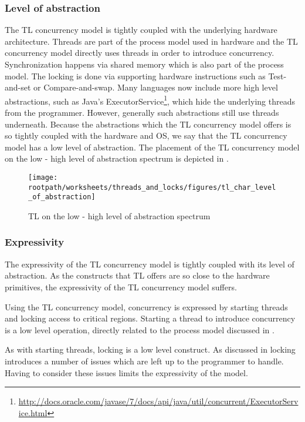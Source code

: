 \subsubsection{Level of abstraction}\label{sec:tl_level_of_abstraction}
The \ac{TL} concurrency model is tightly coupled with the underlying hardware architecture. Threads are part of the process model used in hardware and the \ac{TL} concurrency model directly uses threads in order to introduce concurrency. Synchronization happens via shared memory which is also part of the process model. The locking is done via supporting hardware instructions such as Test-and-set or Compare-and-swap\cite[p. 1990]{scott2011sync}. Many languages now include more high level abstractions, such as Java's ExecutorService\footnote{\url{http://docs.oracle.com/javase/7/docs/api/java/util/concurrent/ExecutorService.html}}, which hide the underlying threads from the programmer. However, generally such abstractions still use threads underneath. Because the abstractions which the \ac{TL} concurrency model offers is so tightly coupled with the hardware and \ac{OS}, we say that the \ac{TL} concurrency model has a low level of abstraction. The placement of the \ac{TL} concurrency model on the low - high level of abstraction spectrum is depicted in .

\begin{figure}[htbp]
\centering
 \texttt{[image: \\rootpath/worksheets/threads\_and\_locks/figures/tl\_char\_level\_of\_abstraction]} 
 \caption{\ac{TL} on the low - high level of abstraction spectrum}
\label{fig:char_tl_level_of_abstraction}
\end{figure}

\subsubsection{Expressivity}\label{sec:tl_expressivity}
The expressivity of the \ac{TL} concurrency model is tightly coupled with its level of abstraction. As the constructs that \ac{TL} offers are so close to the hardware primitives, the expressivity of the \ac{TL} concurrency model suffers.

Using the \ac{TL} concurrency model, concurrency is expressed by starting threads and locking access to critical regions. Starting a thread to introduce concurrency is a low level operation, directly related to the process model discussed in .

As with starting threads, locking is a low level construct. As discussed in  locking introduces a number of issues which are left up to the programmer to handle. Having to consider these issues limits the expressivity of the model.

